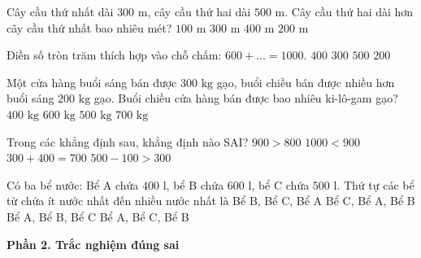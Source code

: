 \begin{ex} %
Cây cầu thứ nhất dài $300\text{ m}$, cây cầu thứ hai dài $500\text{ m}$. Cây cầu thứ hai dài hơn cây cầu thứ nhất bao nhiêu mét?
\choice
{$100\text{ m}$}
{$300\text{ m}$}
{$400\text{ m}$}
{\True $200\text{ m}$}
\end{ex}

\begin{ex} %
Điền số tròn trăm thích hợp vào chỗ chấm: $600 + \dots = 1 000$.
\choice
{\True $400$}
{$300$}
{$500$}
{$200$}
\end{ex}

\begin{ex} %
Một cửa hàng buổi sáng bán được $300\text{ kg}$ gạo, buổi chiều bán được nhiều hơn buổi sáng $200\text{ kg}$ gạo. Buổi chiều cửa hàng bán được bao nhiêu ki-lô-gam gạo?
\choice
{$400\text{ kg}$}
{$600\text{ kg}$}
{\True $500\text{ kg}$}
{$700\text{ kg}$}
\end{ex}

\begin{ex} %
Trong các khẳng định sau, khẳng định nào SAI?
\choice
{$900 > 800$}
{\True $1 000 < 900$}
{$300 + 400 = 700$}
{$500 - 100 > 300$}
\end{ex}

\begin{ex} %
Có ba bể nước: Bể A chứa $400\text{ l}$, bể B chứa $600\text{ l}$, bể C chứa $500\text{ l}$. Thứ tự các bể từ chứa ít nước nhất đến nhiều nước nhất là
\choice
{Bể B, Bể C, Bể A}
{Bể C, Bể A, Bể B}
{Bể A, Bể B, Bể C}
{\True Bể A, Bể C, Bể B}
\end{ex}

\textbf{Phần 2. Trắc nghiệm đúng sai}

